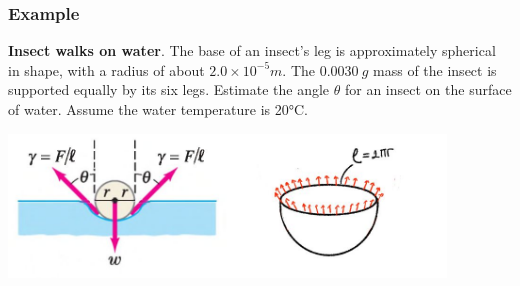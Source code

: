\documentclass[]{beamer}
\begin{document}
\begin{frame}

\frametitle{Example \theexamplef}



\textbf{Insect walks on water}. The base of an insect’s leg is approximately spherical in shape, with a radius of about
$2.0 \times 10^{-5} m$. The $0.0030~g$ mass of the insect is supported equally by its six legs.
Estimate the angle $\theta$ for an insect on the surface of water.
Assume the water temperature is 20°C.

    \begin{center}
  \includegraphics[height=1.5in]{images2/mosquito.jpg}
\end{center}


 \end{frame}

\end{document}
